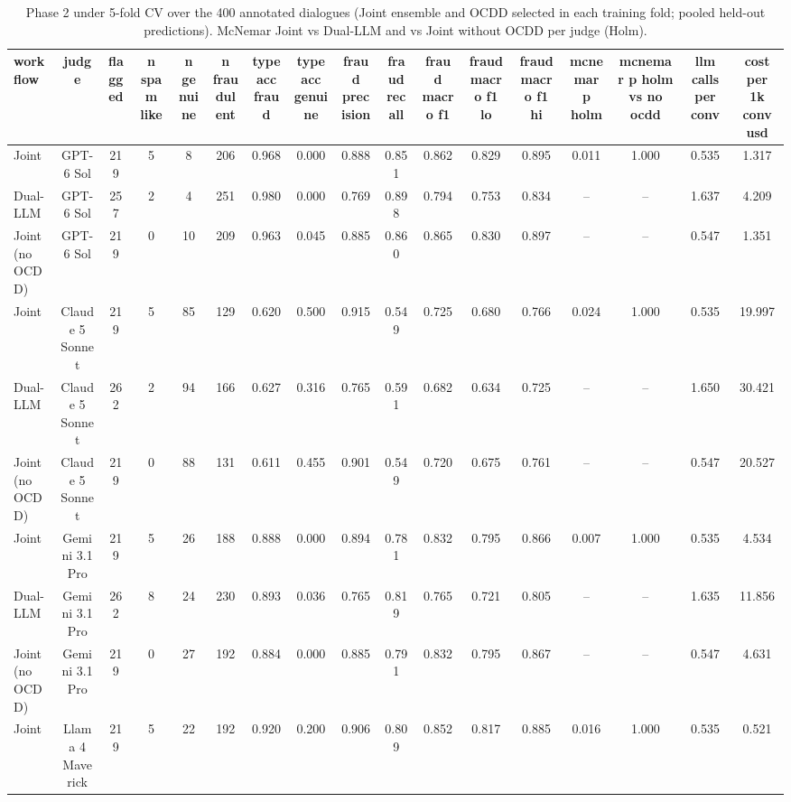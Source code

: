 \begin{table}[htbp]
\centering
\caption{Phase 2 under 5-fold CV over the 400 annotated dialogues (Joint ensemble and OCDD selected in each training fold; pooled held-out predictions). McNemar Joint vs Dual-LLM and vs Joint without OCDD per judge (Holm).}
\label{tab:table5b_phase2_cv}
\small
\begin{tabular}{lcccccccccccccccc}
\toprule
\textbf{workflow} & \textbf{judge} & \textbf{flagged} & \textbf{n spam like} & \textbf{n genuine} & \textbf{n fraudulent} & \textbf{type acc fraud} & \textbf{type acc genuine} & \textbf{fraud precision} & \textbf{fraud recall} & \textbf{fraud macro f1} & \textbf{fraud macro f1 lo} & \textbf{fraud macro f1 hi} & \textbf{mcnemar p holm} & \textbf{mcnemar p holm vs no ocdd} & \textbf{llm calls per conv} & \textbf{cost per 1k conv usd} \\
\midrule
Joint & GPT-6 Sol & 219 & 5 & 8 & 206 & 0.968 & 0.000 & 0.888 & 0.851 & 0.862 & 0.829 & 0.895 & 0.011 & 1.000 & 0.535 & 1.317 \\
Dual-LLM & GPT-6 Sol & 257 & 2 & 4 & 251 & 0.980 & 0.000 & 0.769 & 0.898 & 0.794 & 0.753 & 0.834 & -- & -- & 1.637 & 4.209 \\
Joint (no OCDD) & GPT-6 Sol & 219 & 0 & 10 & 209 & 0.963 & 0.045 & 0.885 & 0.860 & 0.865 & 0.830 & 0.897 & -- & -- & 0.547 & 1.351 \\
Joint & Claude 5 Sonnet & 219 & 5 & 85 & 129 & 0.620 & 0.500 & 0.915 & 0.549 & 0.725 & 0.680 & 0.766 & 0.024 & 1.000 & 0.535 & 19.997 \\
Dual-LLM & Claude 5 Sonnet & 262 & 2 & 94 & 166 & 0.627 & 0.316 & 0.765 & 0.591 & 0.682 & 0.634 & 0.725 & -- & -- & 1.650 & 30.421 \\
Joint (no OCDD) & Claude 5 Sonnet & 219 & 0 & 88 & 131 & 0.611 & 0.455 & 0.901 & 0.549 & 0.720 & 0.675 & 0.761 & -- & -- & 0.547 & 20.527 \\
Joint & Gemini 3.1 Pro & 219 & 5 & 26 & 188 & 0.888 & 0.000 & 0.894 & 0.781 & 0.832 & 0.795 & 0.866 & 0.007 & 1.000 & 0.535 & 4.534 \\
Dual-LLM & Gemini 3.1 Pro & 262 & 8 & 24 & 230 & 0.893 & 0.036 & 0.765 & 0.819 & 0.765 & 0.721 & 0.805 & -- & -- & 1.635 & 11.856 \\
Joint (no OCDD) & Gemini 3.1 Pro & 219 & 0 & 27 & 192 & 0.884 & 0.000 & 0.885 & 0.791 & 0.832 & 0.795 & 0.867 & -- & -- & 0.547 & 4.631 \\
Joint & Llama 4 Maverick & 219 & 5 & 22 & 192 & 0.920 & 0.200 & 0.906 & 0.809 & 0.852 & 0.817 & 0.885 & 0.016 & 1.000 & 0.535 & 0.521 \\

\end{tabular}
\end{table}
